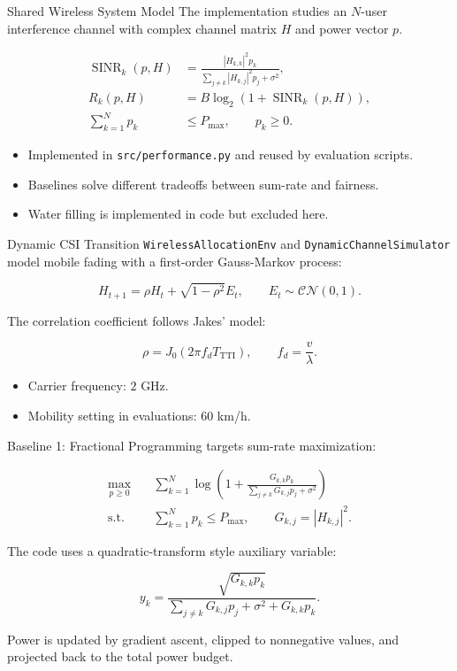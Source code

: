 \documentclass[aspectratio=169]{beamer}
\newcommand{\SINR}{\operatorname{SINR}}
\begin{document}
\begin{frame}{Shared Wireless System Model}
  The implementation studies an $N$-user interference channel with complex channel matrix $H$ and power vector $p$.

  \begin{align*}
    \SINR_k(p, H)
      &= \frac{|H_{k,k}|^2 p_k}
              {\sum_{j \ne k}|H_{k,j}|^2 p_j + \sigma^2}, \\
    R_k(p, H)
      &= B \log_2\left(1 + \SINR_k(p, H)\right), \\
    \sum_{k=1}^{N} p_k &\le P_{\max}, \qquad p_k \ge 0.
  \end{align*}

  \vspace{0.5em}
  \begin{itemize}
    \item Implemented in \texttt{src/performance.py} and reused by evaluation scripts.
    \item Baselines solve different tradeoffs between sum-rate and fairness.
    \item Water filling is implemented in code but excluded here.
  \end{itemize}
\end{frame}

\begin{frame}{Dynamic CSI Transition}
  \texttt{WirelessAllocationEnv} and \texttt{DynamicChannelSimulator} model mobile fading with a first-order Gauss-Markov process:

  \[
    H_{t+1}
      = \rho H_t + \sqrt{1-\rho^2}E_t,
      \qquad
      E_t \sim \mathcal{CN}(0,1).
  \]

  The correlation coefficient follows Jakes' model:

  \[
    \rho = J_0(2\pi f_d T_{\mathrm{TTI}}),
    \qquad
    f_d = \frac{v}{\lambda}.
  \]

  \begin{itemize}
    \item Carrier frequency: $2$ GHz.
    \item Mobility setting in evaluations: $60$ km/h.
  \end{itemize}
\end{frame}

\begin{frame}{Baseline 1: Fractional Programming}
  targets sum-rate maximization:

  \begin{align*}
    \max_{p \ge 0}\quad
      &\sum_{k=1}^{N}\log\left(1 +
        \frac{G_{k,k}p_k}{\sum_{j \ne k}G_{k,j}p_j + \sigma^2}\right) \\
    \text{s.t.}\quad
      &\sum_{k=1}^{N}p_k \le P_{\max},
      \qquad G_{k,j}=|H_{k,j}|^2.
  \end{align*}

  The code uses a quadratic-transform style auxiliary variable:

  \[
    y_k =
    \frac{\sqrt{G_{k,k}p_k}}
         {\sum_{j \ne k}G_{k,j}p_j + \sigma^2 + G_{k,k}p_k}.
  \]

  Power is updated by gradient ascent, clipped to nonnegative values, and projected back to the total power budget.
\end{frame}
\end{document}
